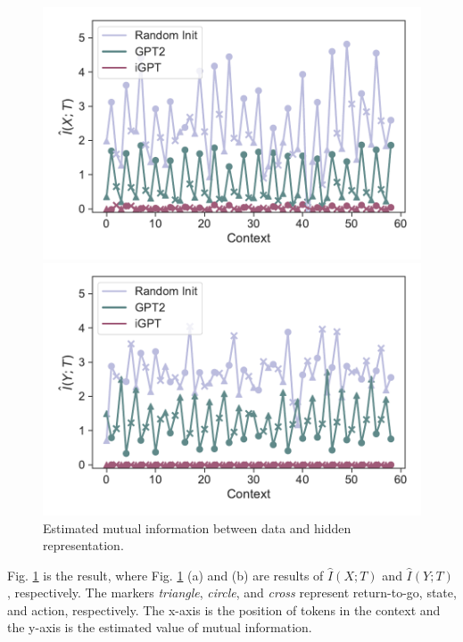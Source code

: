 \begin{figure}[h]
    \centering
    \begin{minipage}[b]{0.4\linewidth}
    \includegraphics[width=\linewidth]{figs/mi_x_6.mlp.dropout_40_gpt2_igpt_dt_hopper_medium_666.pdf}
    \end{minipage}
    \begin{minipage}[b]{0.4\linewidth}
    \includegraphics[width=\linewidth]{figs/mi_y_6.mlp.dropout_40_gpt2_igpt_dt_hopper_medium_666.pdf}
    \end{minipage}
    \caption{Estimated mutual information between data and hidden representation.}
    \label{fig:mutual_information_context}
\end{figure}

Fig. \ref{fig:mutual_information_context} is the result, where Fig. \ref{fig:mutual_information_context} (a) and (b) are results of $\hat{I}(X; T)$ and $\hat{I}(Y; T)$, respectively. The markers \textit{triangle}, \textit{circle}, and \textit{cross} represent return-to-go, state, and action, respectively. The x-axis is the position of tokens in the context and the y-axis is the estimated value of mutual information. 

